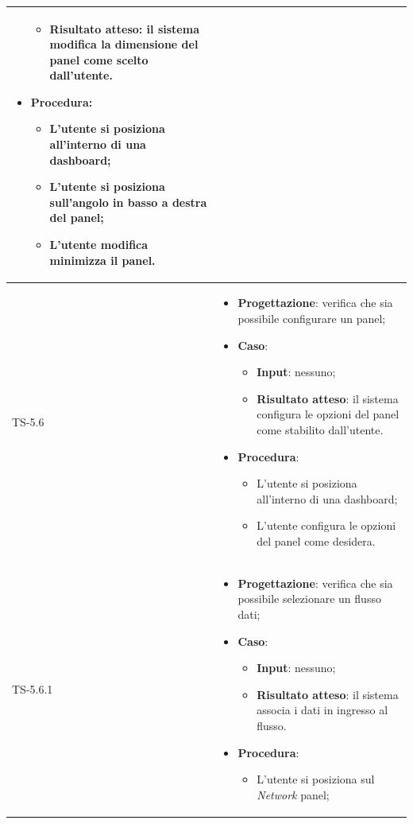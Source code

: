 \begin{longtable}{|C{2.5cm}|C{13cm}|}
\begin{itemize}
\begin{itemize}
		\item \textbf{Risultato atteso}: il sistema modifica la dimensione del panel come scelto dall'utente.
	\end{itemize}
	\item \textbf{Procedura}:
	\begin{itemize}
		\item L'utente si posiziona all'interno di una dashboard;
		\item L'utente si posiziona sull'angolo in basso a destra del panel;
		\item L'utente modifica minimizza il panel.
	\end{itemize} 
\end{itemize}
	 \\
	\hline
	{TS-5.6} & 
\begin{itemize}
	\item \textbf{Progettazione}: verifica che sia possibile configurare un
	panel;
	\item \textbf{Caso}: 
	\begin{itemize}
		\item \textbf{Input}: nessuno;
		\item \textbf{Risultato atteso}: il sistema configura le opzioni del panel come stabilito dall'utente.
	\end{itemize}
	\item \textbf{Procedura}:
	\begin{itemize}
		\item L'utente si posiziona all'interno di una dashboard;
		\item L'utente configura le opzioni del panel come desidera.
	\end{itemize} 
\end{itemize}
	\\
	\hline
	{TS-5.6.1} & 
\begin{itemize}
	\item \textbf{Progettazione}: verifica che sia possibile selezionare un
	flusso dati;
	\item \textbf{Caso}: 
	\begin{itemize}
		\item \textbf{Input}: nessuno;
		\item \textbf{Risultato atteso}: il sistema associa i dati in ingresso al flusso.
	\end{itemize}
	\item \textbf{Procedura}:
	\begin{itemize}
		\item L'utente si posiziona sul \emph{Network} panel;

\end{itemize}
\end{itemize}
\end{longtable}
